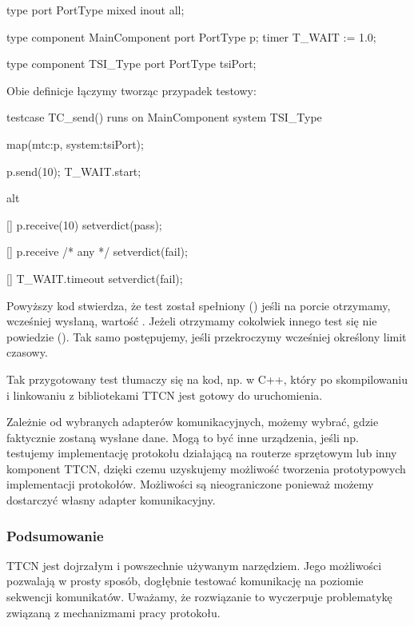 \documentclass[00-praca-magisterska.tex]{subfiles}
\begin{document}
\begin{textcode}
  type port PortType mixed { inout all; }
  
  type component MainComponent
  {
      port PortType p;
      timer T_WAIT := 1.0;
  }
  
  type component TSI_Type
  {
      port PortType tsiPort;
  }
\end{textcode}

Obie definicje łączymy tworząc przypadek testowy:

\begin{textcode}
  testcase TC_send() runs on MainComponent system TSI_Type
  {
      map(mtc:p, system:tsiPort);
  
      p.send(10);
      T_WAIT.start;
  
      alt
      {
          [] p.receive(10)
          {
              setverdict(pass);
          }
  
          [] p.receive /* any */
          {
              setverdict(fail);
          }
  
          [] T_WAIT.timeout
          {
              setverdict(fail);
          }
      }
  }
\end{textcode}

Powyższy kod stwierdza, że test został spełniony ()
jeśli na porcie  otrzymamy, wcześniej wysłaną, wartość .
Jeżeli otrzymamy cokolwiek innego test się nie powiedzie
().  Tak samo postępujemy, jeśli przekroczymy wcześniej
określony limit czasowy.

Tak przygotowany test tłumaczy się na kod, np. w C++, który po skompilowaniu i
linkowaniu z bibliotekami TTCN jest gotowy do uruchomienia.

Zależnie od wybranych adapterów komunikacyjnych, możemy wybrać, gdzie
faktycznie zostaną wysłane dane. Mogą to być inne urządzenia, jeśli np.
testujemy implementację protokołu działającą na routerze sprzętowym lub inny
komponent TTCN, dzięki czemu uzyskujemy możliwość tworzenia prototypowych
implementacji protokołów. Możliwości są nieograniczone ponieważ możemy
dostarczyć własny adapter komunikacyjny.

\subsubsection{Podsumowanie}

TTCN jest dojrzałym i powszechnie używanym narzędziem. Jego możliwości pozwalają
w prosty sposób, dogłębnie testować komunikację na poziomie sekwencji
komunikatów. Uważamy, że rozwiązanie to wyczerpuje problematykę związaną z
mechanizmami pracy protokołu.
\end{document}
